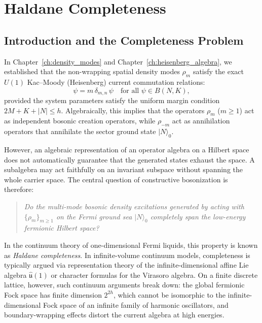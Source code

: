\chapter{Haldane Completeness}
\label{ch:haldane_completeness}

\section{Introduction and the Completeness Problem}

In Chapter~\ref{ch:density_modes} and Chapter~\ref{ch:heisenberg_algebra}, we established that the non-wrapping spatial density modes $\rho_m$ satisfy the exact $U(1)$ Kac--Moody (Heisenberg) current commutation relations:
\begin{equation}
[\rho_{-m}, \rho_n] \psi = m\, \delta_{m, n}\, \psi \quad \text{for all } \psi \in B(N, K),
\end{equation}
provided the system parameters satisfy the uniform margin condition $2M + K + |N| \le h$.
Algebraically, this implies that the operators $\rho_m$ ($m \ge 1$) act as independent bosonic creation operators, while $\rho_{-m}$ act as annihilation operators that annihilate the sector ground state $|N\rangle_0$.

However, an algebraic representation of an operator algebra on a Hilbert space does not automatically guarantee that the generated states exhaust the space. A subalgebra may act faithfully on an invariant subspace without spanning the whole carrier space. The central question of constructive bosonization is therefore:
\begin{quote}
\emph{Do the multi-mode bosonic density excitations generated by acting with $\{\rho_m\}_{m \ge 1}$ on the Fermi ground sea $|N\rangle_0$ completely span the low-energy fermionic Hilbert space?}
\end{quote}
In the continuum theory of one-dimensional Fermi liquids, this property is known as \emph{Haldane completeness}. In infinite-volume continuum models, completeness is typically argued via representation theory of the infinite-dimensional affine Lie algebra $\widehat{\mathfrak{u}}(1)$ or character formulas for the Virasoro algebra. On a finite discrete lattice, however, such continuum arguments break down: the global fermionic Fock space has finite dimension $2^{2h}$, which cannot be isomorphic to the infinite-dimensional Fock space of an infinite family of harmonic oscillators, and boundary-wrapping effects distort the current algebra at high energies.

